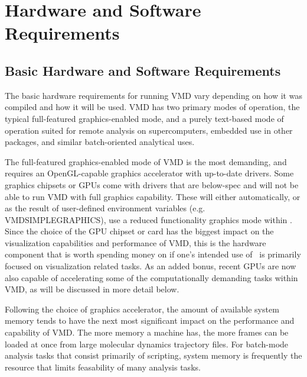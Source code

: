 %
%
%

\chapter{Hardware and Software Requirements}
\label{chapter:requirements:ug}

\section{Basic Hardware and Software Requirements}
The basic hardware requirements for running VMD vary depending on 
how it was compiled and how it will be used.  VMD has two primary
modes of operation, the typical full-featured graphics-enabled mode, 
and a purely text-based mode of operation suited for remote analysis
on supercomputers, embedded use in other packages, and similar 
batch-oriented analytical uses.  

The full-featured graphics-enabled mode of VMD is the most demanding,
and requires an OpenGL-capable graphics accelerator with up-to-date 
drivers.  Some graphics chipsets or GPUs come with drivers that are
below-spec and will not be able to run VMD with full graphics capability.
These will either automatically, or as the result of 
user-defined environment variables (e.g. VMDSIMPLEGRAPHICS), 
use a reduced functionality graphics mode within \VMD.
Since the choice of the GPU chipset or card has the biggest
impact on the visualization capabilities and performance of VMD,
this is the hardware component that is worth spending money on 
if one's intended use of \VMD\ is primarily focused on visualization related
tasks.  As an added bonus, recent GPUs are now also capable of accelerating
some of the computationally demanding tasks within VMD, as will be discussed
in more detail below.

Following the choice of graphics accelerator, the amount of available
system memory tends to have the next most significant impact on the
performance and capability of VMD.  The more memory a machine has,
the more frames can be loaded at once from large molecular
dynamics trajectory files.  For batch-mode analysis tasks 
that consist primarily of scripting, system memory is frequently the
resource that limits feasability of many analysis tasks.

